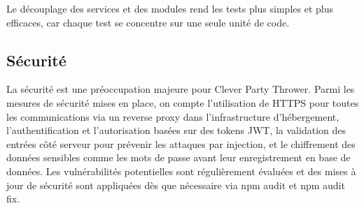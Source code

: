 Le découplage des services et des modules rend les tests plus simples et plus efficaces, car chaque test se concentre sur une seule unité de code.

\subsection{Sécurité}\label{subsec:securite}
La sécurité est une préoccupation majeure pour Clever Party Thrower.
Parmi les mesures de sécurité mises en place, on compte l'utilisation de HTTPS pour toutes les communications via un reverse proxy dans l'infrastructure d'hébergement,
l'authentification et l'autorisation basées sur des tokens JWT, la validation des entrées côté serveur pour prévenir les attaques par injection,
et le chiffrement des données sensibles comme les mots de passe avant leur enregistrement en base de données.
Les vulnérabilités potentielles sont régulièrement évaluées et des mises à jour de sécurité sont appliquées dès que nécessaire via npm audit et npm audit fix.